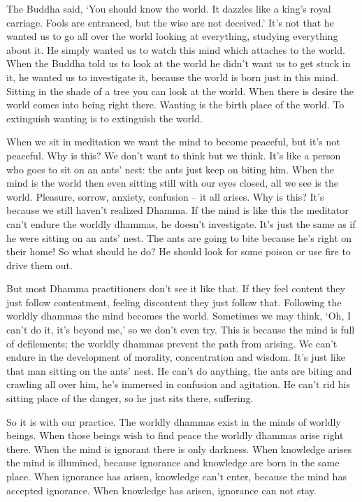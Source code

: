 The Buddha said, `You should know the world. It dazzles like a king's royal carriage. Fools are entranced, but the wise are not deceived.' It's not that he wanted us to go all over the world looking at everything, studying everything about it. He simply wanted us to watch this mind which attaches to the world. When the Buddha told us to look at the world he didn't want us to get stuck in it, he wanted us to investigate it, because the world is born just in this mind. Sitting in the shade of a tree you can look at the world. When there is desire the world comes into being right there. Wanting is the birth place of the world. To extinguish wanting is to extinguish the world.

When we sit in meditation we want the mind to become peaceful, but it's not peaceful. Why is this? We don't want to think but we think. It's like a person who goes to sit on an ants' nest: the ants just keep on biting him. When the mind is the world then even sitting still with our eyes closed, all we see is the world. Pleasure, sorrow, anxiety, confusion -- it all arises. Why is this? It's because we still haven't realized Dhamma. If the mind is like this the meditator can't endure the worldly dhammas, he doesn't investigate. It's just the same as if he were sitting on an ants' nest. The ants are going to bite because he's right on their home! So what should he do? He should look for some poison or use fire to drive them out.

But most Dhamma practitioners don't see it like that. If they feel content they just follow contentment, feeling discontent they just follow that. Following the worldly dhammas the mind becomes the world. Sometimes we may think, `Oh, I can't do it, it's beyond me,' so we don't even try. This is because the mind is full of defilements; the worldly dhammas prevent the path from arising. We can't endure in the development of morality, concentration and wisdom. It's just like that man sitting on the ants' nest. He can't do anything, the ants are biting and crawling all over him, he's immersed in confusion and agitation. He can't rid his sitting place of the danger, so he just sits there, suffering.

So it is with our practice. The worldly dhammas exist in the minds of worldly beings. When those beings wish to find peace the worldly dhammas arise right there. When the mind is ignorant there is only darkness. When knowledge arises the mind is illumined, because ignorance and knowledge are born in the same place. When ignorance has arisen, knowledge can't enter, because the mind has accepted ignorance. When knowledge has arisen, ignorance can not stay.

